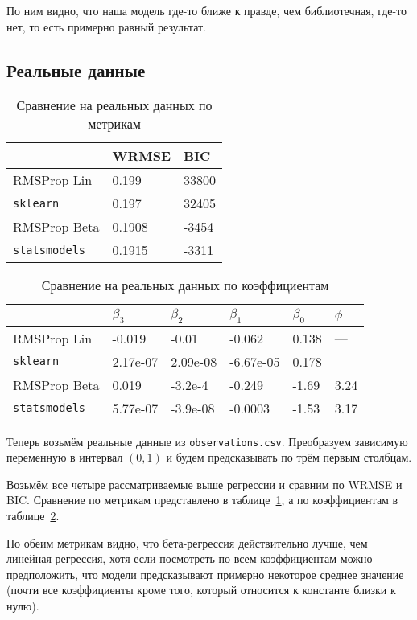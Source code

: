 \documentclass[12pt]{article}
\begin{document}
	По ним видно, что наша модель где-то ближе к правде, чем библиотечная, где-то нет, то есть примерно равный результат.
	
	\subsection{Реальные данные}
	
	\begin{table}[!h]
		\centering
		\caption{Сравнение на реальных данных по метрикам}
		\begin{tabular}{|l|l|l|}
			\hline
			& WRMSE & BIC \\ \hline
			RMSProp Lin & 0.199 & 33800 \\ \hline
			\verb|sklearn| & 0.197 & 32405 \\ \hline
			RMSProp Beta & 0.1908 & -3454 \\ \hline
			\verb|statsmodels| & 0.1915 & -3311 \\ \hline
		\end{tabular}
		\label{table4}
	\end{table}
	
	\begin{table}[!h]
		\centering
		\caption{Сравнение на реальных данных по коэффициентам}
		\begin{tabular}{|l|l|l|l|l|l|}
			\hline
			& $\beta _3$ & $\beta _2$ &$\beta _1$ &$\beta _0$ & $\phi$ \\ \hline
			RMSProp Lin & -0.019 & -0.01 & -0.062 & 0.138 & --- \\ \hline
			\verb|sklearn| & 2.17e-07 & 2.09e-08 & -6.67e-05 & 0.178 & --- \\ \hline
			RMSProp Beta & 0.019 & -3.2e-4 & -0.249 & -1.69 & 3.24 \\ \hline
			\verb|statsmodels| & 5.77e-07 & -3.9e-08 & -0.0003 & -1.53 & 3.17 \\ \hline
		\end{tabular}
		\label{table5}
	\end{table}
	
	Теперь возьмём реальные данные из \verb|observations.csv|. Преобразуем зависимую переменную в интервал $(0, 1)$ и будем предсказывать по трём первым столбцам.
	
	Возьмём все четыре рассматриваемые выше регрессии и сравним по WRMSE и BIC. Сравнение по метрикам представлено в таблице~\ref{table4}, а по коэффициентам в таблице~\ref{table5}.
	
	По обеим метрикам видно, что бета-регрессия действительно лучше, чем линейная регрессия, хотя если посмотреть по всем коэффициентам можно предположить, что модели предсказывают примерно некоторое среднее значение (почти все коэффициенты кроме того, который относится к константе близки к нулю).
	
\end{document}
